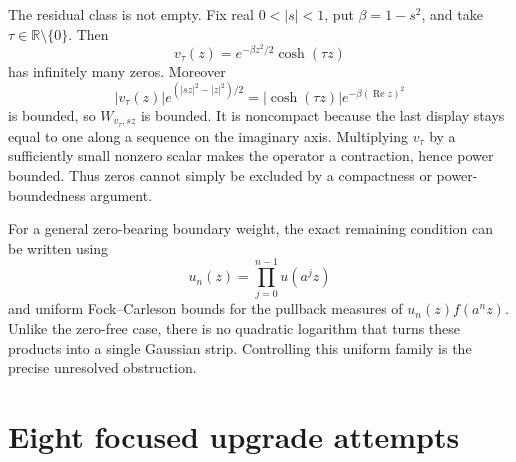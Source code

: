 \documentclass[11pt]{article}
\begin{document}
The residual class is not empty.  Fix real $0<|s|<1$, put
$\beta=1-s^2$, and take $\tau\in\mathbb R\setminus\{0\}$.  Then
\[
 v_\tau(z)=e^{-\beta z^2/2}\cosh(\tau z)
 \tag{13}\label{eq:zeros}
\]
has infinitely many zeros.  Moreover
\[
 |v_\tau(z)|e^{(|sz|^2-|z|^2)/2}
 =|\cosh(\tau z)|e^{-\beta(\operatorname{Re}z)^2}
\]
is bounded, so $W_{v_\tau,sz}$ is bounded.  It is noncompact because the
last display stays equal to one along a sequence on the imaginary axis.
Multiplying $v_\tau$ by a sufficiently small nonzero scalar makes the
operator a contraction, hence power bounded.  Thus zeros cannot simply be
excluded by a compactness or power-boundedness argument.

For a general zero-bearing boundary weight, the exact remaining condition
can be written using
\[
 u_n(z)=\prod_{j=0}^{n-1}u(a^jz)
\]
and uniform Fock--Carleson bounds for the pullback measures of
$u_n(z)f(a^nz)$.  Unlike the zero-free case, there is no quadratic logarithm
that turns these products into a single Gaussian strip.  Controlling this
uniform family is the precise unresolved obstruction.

\section{Eight focused upgrade attempts}
\end{document}
